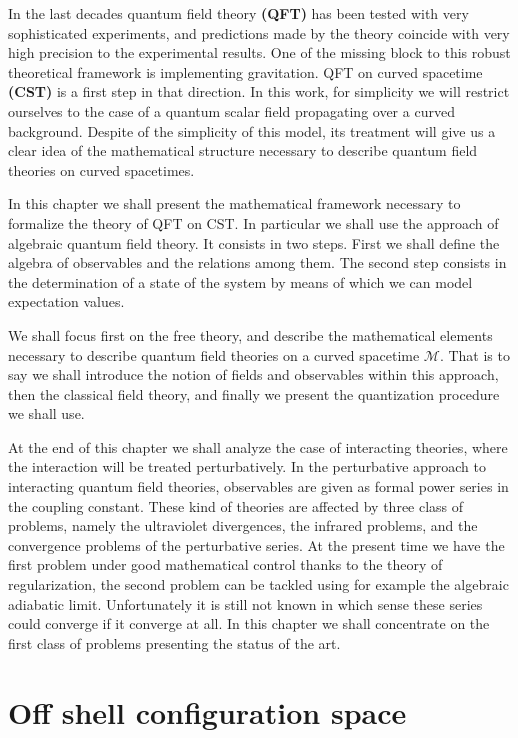 \documentclass[11pt]{book}
\newcommand{\Mcal}{\mathcal{M}}
\theoremstyle{break}
\begin{document}
In the last decades quantum field theory \textbf{(QFT)} has been tested with very sophisticated experiments, and predictions made by the theory coincide with very high precision to the experimental results. One of the missing block to this robust theoretical framework is implementing gravitation. QFT on curved spacetime \textbf{(CST)} is a first step in that direction. In this work, for simplicity we will restrict ourselves to the case of a quantum scalar field propagating over a curved background. Despite of the simplicity of this model, its treatment will give us a clear idea of the mathematical structure necessary to describe quantum field theories on curved spacetimes.


In this chapter we shall present the mathematical framework necessary to formalize the theory of QFT on CST. In particular we shall use the approach of algebraic quantum field theory. It consists in two steps. First we shall define the algebra of observables and the relations among them. The second step consists in the determination of a state of the system by means of which we can model expectation values.


We shall focus first on the free theory, and describe the mathematical elements necessary to describe quantum field theories on a curved spacetime $\Mcal$. That is to say we shall introduce the notion of fields and observables within this approach, then the classical field theory, and finally we present the quantization procedure we shall use.


At the end of this chapter we shall analyze the case of interacting theories, where the interaction will be treated perturbatively. In the perturbative approach to interacting quantum field theories, observables are given as formal power series in the coupling constant. These kind of theories are affected by three class of problems, namely the ultraviolet divergences, the infrared problems, and the convergence problems of the perturbative series. At the present time we have the first problem under good mathematical control thanks to the theory of regularization, the second problem can be tackled using for example the algebraic adiabatic limit. Unfortunately it is still not known in which sense these series could converge if it converge at all. In this chapter we shall concentrate on the first class of problems presenting the status of the art.


\section{Off shell configuration space}
\label{p:OFF_SHELL_CONFIG_SPACE}
\end{document}
